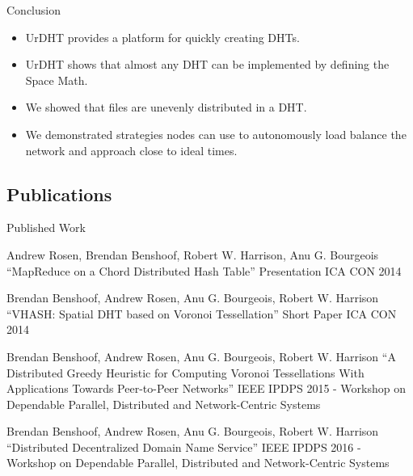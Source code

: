 \documentclass[11pt]{beamer}
\begin{document}
\begin{frame}{Conclusion}
	\begin{itemize}
		\item UrDHT provides a platform for quickly creating DHTs.
		\item UrDHT shows that almost any DHT can be implemented by defining the Space Math.
		\item We showed that files are  unevenly distributed in a DHT.
		\item We demonstrated strategies nodes can use to autonomously load balance the network and approach close to ideal times.
	\end{itemize}
\end{frame}



\subsection{Publications}
\begin{frame}{Published Work}
 	\begin{itemize}\tiny{
		\item Andrew Rosen, Brendan Benshoof, Robert W. Harrison, Anu G. Bourgeois ``MapReduce on a Chord Distributed Hash Table'' Presentation ICA CON 2014
		\item Brendan Benshoof, Andrew Rosen, Anu G. Bourgeois, Robert W. Harrison ``VHASH: Spatial DHT based on Voronoi Tessellation'' Short Paper ICA CON 2014 
		\item Brendan Benshoof, Andrew Rosen, Anu G. Bourgeois, Robert W. Harrison ``A Distributed Greedy Heuristic for Computing Voronoi Tessellations With Applications Towards Peer-to-Peer Networks'' IEEE IPDPS 2015 - Workshop on Dependable Parallel, Distributed and Network-Centric Systems}
		\item Brendan Benshoof, Andrew Rosen, Anu G. Bourgeois, Robert W. Harrison
	``Distributed Decentralized Domain Name Service''
	IEEE IPDPS 2016 - Workshop on Dependable Parallel, Distributed and Network-Centric Systems
	
	\end{itemize}
	
\end{frame}
\end{document}

